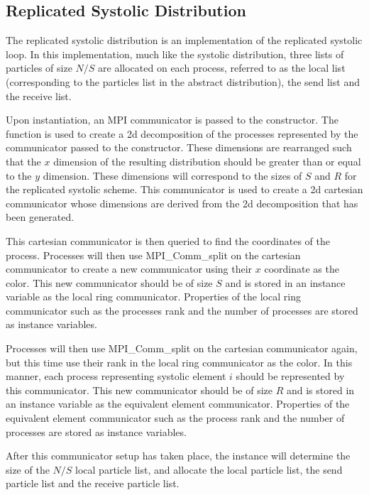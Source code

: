 \subsection{Replicated Systolic Distribution}

The replicated systolic distribution is an implementation of the
replicated systolic loop.
%
In this implementation, much like the systolic distribution,
three lists of particles of size $N/S$ are allocated on each process,
referred to as the local list (corresponding to the particles list
in the abstract distribution), the send list and the receive list.

Upon instantiation, an MPI communicator is passed to the constructor.
%
The \mpidimscreate{} function is used to create a 2d decomposition
of the processes represented by the communicator passed to the
constructor.
%
These dimensions are rearranged such that the $x$ dimension of the
resulting distribution should be greater than or equal to the $y$
dimension.
%
These dimensions will correspond to the sizes of $S$ and $R$ for
the replicated systolic scheme.
%
This communicator is used to create a 2d cartesian communicator whose
dimensions are derived from the 2d decomposition that has been generated.

This cartesian communicator is then queried to find the coordinates of
the process.
%
Processes will then use MPI\_Comm\_split on the cartesian communicator
to create a new communicator using their $x$ coordinate as the color.
%
This new communicator should be of size $S$ and
is stored in an instance variable as the local ring communicator.
%
Properties of the local ring communicator such as the processes rank
and the number of processes are stored as instance variables.

Processes will then use MPI\_Comm\_split on the cartesian communicator
again, but this time use their rank in the local ring communicator as
the color.
%
In this manner, each process representing systolic element $i$ should
be represented by this communicator.
%
This new communicator should be of size $R$ and is stored in an instance
variable as the equivalent element communicator.
%
Properties of the equivalent element communicator such as the process rank
and the number of processes are stored as instance variables.

After this communicator setup has taken place, the instance will determine
the size of the $N/S$ local particle list, and allocate the local particle
list, the send particle list and the receive particle list.

